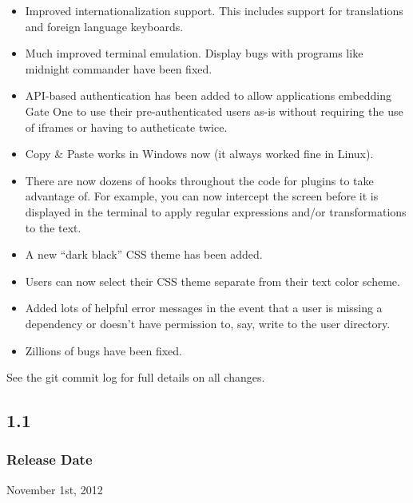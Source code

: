 \documentclass[letterpaper,10pt,openany]{sphinxmanual}
\begin{document}
\begin{itemize}
\item {} 
Improved internationalization support.  This includes support for translations and foreign language keyboards.

\item {} 
Much improved terminal emulation.  Display bugs with programs like midnight commander have been fixed.

\item {} 
API-based authentication has been added to allow applications embedding Gate One to use their pre-authenticated users as-is without requiring the use of iframes or having to autheticate twice.

\item {} 
Copy \& Paste works in Windows now (it always worked fine in Linux).

\item {} 
There are now dozens of hooks throughout the code for plugins to take advantage of.  For example, you can now intercept the screen before it is displayed in the terminal to apply regular expressions and/or transformations to the text.

\item {} 
A new ``dark black'' CSS theme has been added.

\item {} 
Users can now select their CSS theme separate from their text color scheme.

\item {} 
Added lots of helpful error messages in the event that a user is missing a dependency or doesn't have permission to, say, write to the user directory.

\item {} 
Zillions of bugs have been fixed.

\end{itemize}

See the git commit log for full details on all changes.


\subsection{1.1}
\label{ReleaseNotes/index:id5}

\subsubsection{Release Date}
\label{ReleaseNotes/index:id6}
November 1st, 2012
\end{document}
